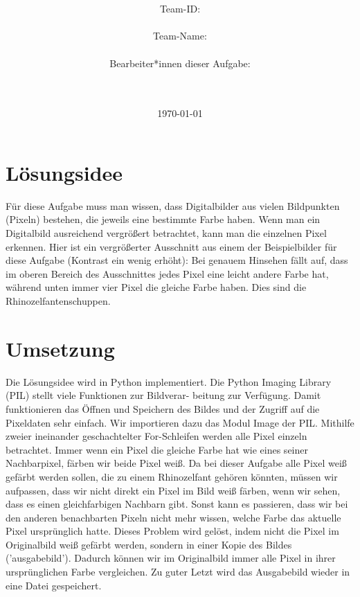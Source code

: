 \documentclass[a4paper,10pt,ngerman]{scrartcl}
\title{\textbf{\Huge\Aufgabe}}
\author{\LARGE Team-ID: \LARGE \TeamId \\\\
	    \LARGE Team-Name: \LARGE \TeamName \\\\
	    \LARGE Bearbeiter*innen dieser Aufgabe: \\ 
	    \LARGE \Namen\\\\}
\date{\LARGE\today}
\begin{document}
\maketitle
\tableofcontents

\vspace{0.5cm}




\section{Lösungsidee}
Für diese Aufgabe muss man wissen, dass Digitalbilder aus vielen Bildpunkten (Pixeln) bestehen, die jeweils eine bestimmte Farbe haben. Wenn man ein Digitalbild 
ausreichend vergrößert betrachtet, kann man die einzelnen Pixel erkennen. Hier ist ein vergrößerter Ausschnitt aus einem der Beispielbilder für diese Aufgabe (Kontrast ein 
wenig erhöht): Bei genauem Hinsehen fällt auf, dass im oberen Bereich des Ausschnittes jedes Pixel eine leicht andere Farbe hat, während unten immer vier Pixel die gleiche Farbe haben. 
Dies sind die Rhinozelfantenschuppen. 
\section{Umsetzung}
Die Lösungsidee wird in Python implementiert. Die Python Imaging Library (PIL) stellt viele Funktionen zur Bildverar- beitung zur Verfügung. Damit funktionieren das Öffnen und 
Speichern des Bildes und der Zugriff auf die Pixeldaten sehr einfach. Wir importieren dazu das Modul Image der PIL. Mithilfe zweier ineinander geschachtelter For-Schleifen 
werden alle Pixel einzeln betrachtet. Immer wenn ein Pixel die gleiche Farbe hat wie eines seiner Nachbarpixel, färben wir beide Pixel weiß. Da bei dieser Aufgabe alle Pixel weiß gefärbt werden sollen, die zu einem Rhinozelfant gehören könnten, müssen wir aufpassen, dass wir nicht direkt ein Pixel im Bild weiß färben, wenn wir sehen, dass es einen gleichfarbigen Nachbarn 
gibt. Sonst kann es passieren, dass wir bei den anderen benachbarten Pixeln nicht mehr wissen, welche Farbe das aktuelle Pixel ursprünglich hatte. Dieses Problem wird 
gelöst, indem nicht die Pixel im Originalbild weiß gefärbt werden, sondern in einer Kopie des Bildes ('ausgabebild'). Dadurch können wir im Originalbild immer alle Pixel in ihrer 
ursprünglichen Farbe vergleichen. Zu guter Letzt wird das Ausgabebild wieder in eine Datei 
gespeichert. 
\end{document}

